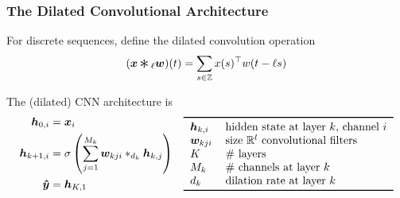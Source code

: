 \begin{frame}
	\frametitle{The Dilated Convolutional Architecture}

	For discrete sequences, define the dilated convolution operation
	\begin{equation*}
		({\bm{x}} \Conv{}_{\ell} {\bm{w}})(t)
		=
		\sum_{s \in \Z}
		{x}(s)^\tp
		{w}(t- \ell s)
	\end{equation*}

	\pause{}

	The \alert{(dilated) CNN architecture} is
	\begin{equation*}
		\begin{aligned}
			\bm h_{0,i} &= \bm x_i\\
			\bm h_{k+1,i} &= \sigma \left(\sum_{j=1}^{M_k} {\bm w}_{kji} *_{d_k} \bm h_{k,j} \right)\\
			\bm {\hat y} &= \bm h_{K,1}
		\end{aligned}
		\quad
		\begin{tabular}{ll}
			\toprule
			$\bm h_{k,i}$ & hidden state at layer $k$, channel $i$ \\
			$\bm w_{kji}$ & size $\R^l$ convolutional filters \\
			$K$           & \# layers \\
			$M_k$	      & \# channels at layer $k$ \\
			$d_k$ 		  & dilation rate at layer $k$ \\
			\bottomrule
		\end{tabular}
	\end{equation*}
\end{frame}

